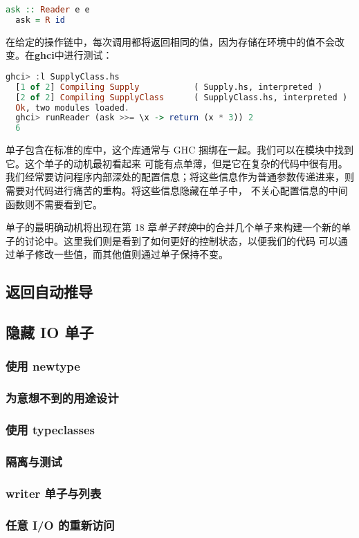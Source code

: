 \documentclass[./main.tex]{subfiles}
\begin{document}
\begin{lstlisting}[language=Haskell]
  ask :: Reader e e
  ask = R id
\end{lstlisting}

在给定的操作链中，每次调用都将返回相同的值，因为存储在环境中的值不会改变。在\textbf{ghci}中进行测试：

\begin{lstlisting}[language=Haskell]
  ghci> :l SupplyClass.hs
  [1 of 2] Compiling Supply           ( Supply.hs, interpreted )
  [2 of 2] Compiling SupplyClass      ( SupplyClass.hs, interpreted )
  Ok, two modules loaded.
  ghci> runReader (ask >>= \x -> return (x * 3)) 2
  6
\end{lstlisting}

单子包含在标准的库中，这个库通常与 GHC 捆绑在一起。我们可以在模块中找到它。这个单子的动机最初看起来
可能有点单薄，但是它在复杂的代码中很有用。我们经常要访问程序内部深处的配置信息；将这些信息作为普通参数传递进来，则需要对代码进行痛苦的重构。将这些信息隐藏在单子中，
不关心配置信息的中间函数则不需要看到它。

单子的最明确动机将出现在第 18 章\textit{单子转换}中的合并几个单子来构建一个新的单子的讨论中。这里我们则是看到了如何更好的控制状态，以便我们的代码
可以通过单子修改一些值，而其他值则通过单子保持不变。

\subsection*{返回自动推导}


\subsection*{隐藏 IO 单子}

\subsubsection*{使用 newtype}

\subsubsection*{为意想不到的用途设计}

\subsubsection*{使用 typeclasses}

\subsubsection*{隔离与测试}

\subsubsection*{writer 单子与列表}

\subsubsection*{任意 I/O 的重新访问}
\end{document}
